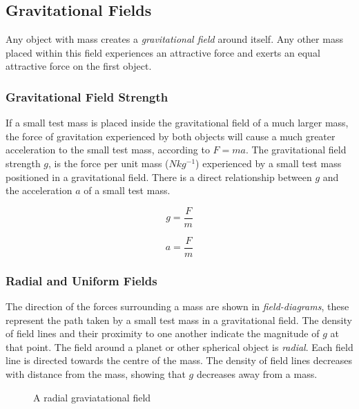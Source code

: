 \documentclass[12pt]{article}
\begin{document}
\subsection{Gravitational Fields}
\label{sec:orge48579c}

Any object with mass creates a \emph{gravitational field} around itself. Any other mass placed within this field experiences an attractive force and exerts an equal attractive force on the first object.

\subsubsection{Gravitational Field Strength}
\label{sec:org1f4e459}

If a small test mass is placed inside the gravitational field of a much larger mass, the force of gravitation experienced by both objects will cause a much greater acceleration to the small test mass, according to \(F = ma\). The gravitational field strength \(g\), is the force per unit mass (\(Nkg^{-1}\)) experienced by a small test mass positioned in a gravitational field. There is a direct relationship between \(g\) and the acceleration \(a\) of a small test mass.

\[g = \dfrac{F}{m}\]

\[a = \dfrac{F}{m}\]

\subsubsection{Radial and Uniform Fields}
\label{sec:org301a243}

The direction of the forces surrounding a mass are shown in \emph{field-diagrams}, these represent the path taken by a small test mass in a gravitational field. The density of field lines and their proximity to one another indicate the magnitude of \(g\) at that point. The field around a planet or other spherical object is \emph{radial}. Each field line is directed towards the centre of the mass. The density of field lines decreases with distance from the mass, showing that \(g\) decreases away from a mass.

\begin{figure}[H]
\centering
{}
\caption{A radial graviatational field}
\end{figure}
\end{document}
